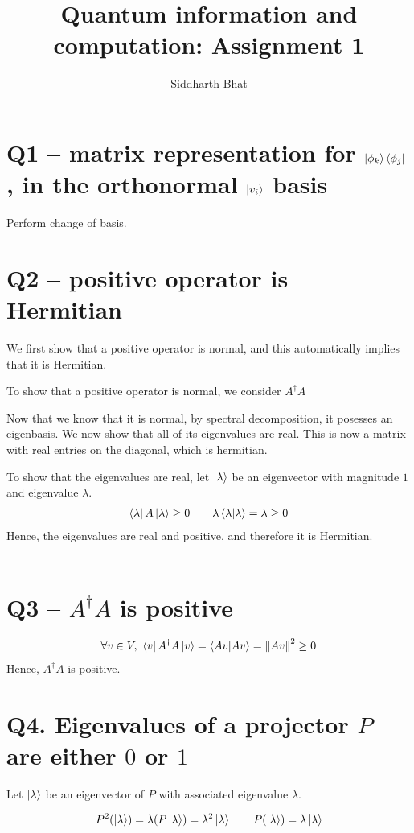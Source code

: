 \documentclass[11pt]{book}
\title{Quantum information and computation: Assignment 1}
\author{Siddharth Bhat}
\date{}
\begin{document}
\section{Q1 -- matrix representation for $\ket{\phi_k}\bra{\phi_j}$, in the
orthonormal $\ket{v_i}$ basis}

Perform change of basis.

\section{Q2 -- positive operator is Hermitian}
We first show that a positive operator is normal, and this automatically
implies that it is Hermitian.

To show that a positive operator is normal, we consider $A^\dagger A$

Now that we know that it is normal, by spectral decomposition, it
posesses an eigenbasis. We now show that all of its eigenvalues are real.
This is now a matrix with real entries on the diagonal, which is hermitian.

To show that the eigenvalues are real, let $\ket \lambda$ be an eigenvector
with magnitude $1$ and eigenvalue $\lambda$.
\begin{align*}
    \bra \lambda A \ket \lambda \geq 0 \qquad
    \lambda \braket{\lambda} = \lambda \geq 0
\end{align*}
Hence, the eigenvalues are real and positive, and therefore it is Hermitian.

\begin{align*}
\end{align*}

\section{Q3 -- $A^\dagger A$ is positive}
\begin{align*}
    \forall v \in V, ~\bra v A^\dagger A \ket v = \bra {A v} \ket {A v} = \norm{A v}^2 \geq 0
\end{align*}
Hence, $A^\dagger A$ is positive.

\section{Q4. Eigenvalues of a projector $P$ are either $0$ or $1$}
Let $\ket \lambda$ be an eigenvector of $P$ with associated eigenvalue
$\lambda$.  

\begin{align*}
    P^2 (\ket \lambda) = \lambda (P \ket \lambda) = \lambda ^2 \ket \lambda \qquad
    P (\ket \lambda) = \lambda \ket \lambda
\end{align*}
\end{document}
